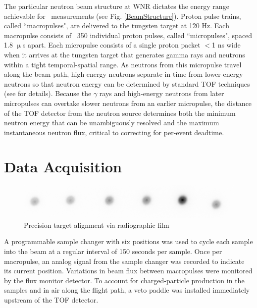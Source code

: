 The particular neutron beam structure at WNR dictates the energy range
achievable for \tot\ measurements (see Fig. \ref{BeamStructure}).
Proton pulse trains, called ``macropulses", are delivered to the tungsten target at 120 Hz.
Each macropulse consists of ~350 individual proton pulses, called ``micropulses", spaced 1.8 
$\upmu$s apart. Each micropulse consists of a single proton packet $<$1 ns wide when it 
arrives at the tungsten target that generates gamma rays and neutrons within a tight
temporal-spatial range. As neutrons from this micropulse travel along the beam path, 
high energy neutrons separate in time from lower-energy neutrons so that neutron
energy can be determined by standard TOF techniques (see \cite{Moore1980} for details).
Because the $\gamma$ rays and high-energy neutrons from later micropulses can
overtake slower neutrons from an earlier micropulse, the distance of the TOF
detector from the neutron source determines both the minimum neutron energy that can be 
unambiguously resolved and the maximum instantaneous neutron flux, critical to correcting
for per-event deadtime.

\section{Data Acquisition}

\begin{figure}
    \includegraphics[scale=0.2]{figures/TargetChangerAlignment.png}
    \caption{Precision target alignment via radiographic film}
    \label{TargetChangerAlignment}
\end{figure}

A programmable sample changer with six positions
was used to cycle each sample into the beam at a regular interval of 150 seconds 
per sample. Once per macropulse, an analog signal from the sample changer was recorded to 
indicate its current position. Variations in beam flux 
between macropulses were monitored by the flux monitor detector. To account for
charged-particle production in the samples and in air along the flight path, a
veto paddle was installed immediately upstream of the TOF detector.

